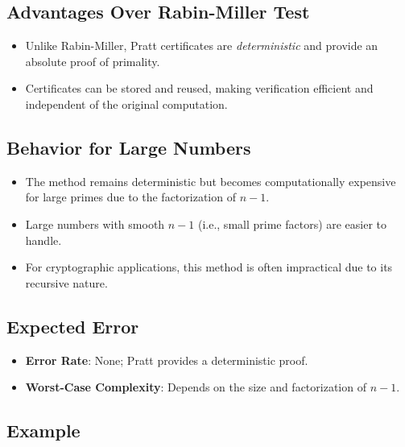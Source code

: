 \documentclass[12pt]{article}
\begin{document}
\subsection*{Advantages Over Rabin-Miller Test}

\begin{itemize}
    \item Unlike Rabin-Miller, Pratt certificates are \emph{deterministic} and provide an absolute proof of primality.
    \item Certificates can be stored and reused, making verification efficient and independent of the original computation.
\end{itemize}

\subsection*{Behavior for Large Numbers}

\begin{itemize}
    \item The method remains deterministic but becomes computationally expensive for large primes due to the factorization of \( n-1 \).
    \item Large numbers with smooth \( n-1 \) (i.e., small prime factors) are easier to handle.
    \item For cryptographic applications, this method is often impractical due to its recursive nature.
\end{itemize}

\subsection*{Expected Error}

\begin{itemize}
    \item \textbf{Error Rate}: None; Pratt provides a deterministic proof.
    \item \textbf{Worst-Case Complexity}: Depends on the size and factorization of \( n-1 \).
\end{itemize}

\subsection*{Example}
\end{document}
